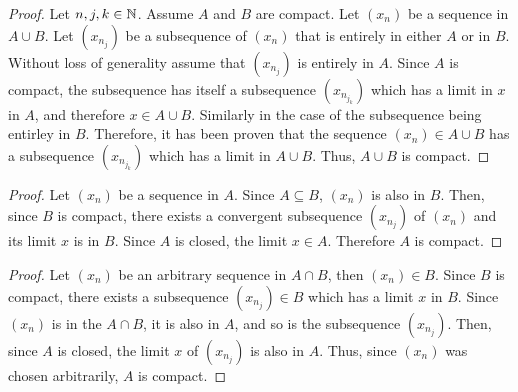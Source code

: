 \begin{questions}


\begin{solution}
  \begin{proof}
  Let $n,j,k\in\mathbb{N}$. Assume $A$ and $B$ are compact. Let $(x_n)$ be a sequence in $A\cup B$. Let $(x_{n_j})$ be a subsequence of $(x_n)$  that is entirely in either $A$ or in $B$. Without loss of generality assume that $(x_{n_j})$ is entirely in $A$. Since $A$ is compact, the subsequence has itself a subsequence $(x_{n_{j_k}})$ which has a limit in $x$ in $A$, and therefore $x\in A\cup B$. Similarly in the case of the subsequence being entirley in $B$. Therefore, it has been proven that the sequence $(x_n)\in A\cup B$ has a subsequence $(x_{n_{j_k}})$ which has a limit in $A\cup B$. Thus, $A\cup B$ is compact.
  \end{proof}
\end{solution}


\begin{solution}
  \begin{proof}
  Let $(x_n)$ be a sequence in $A$. Since $A\subseteq B$, $(x_n)$ is also in $B$. Then, since $B$ is compact, there exists a convergent subsequence $(x_{n_j})$ of $(x_n)$ and its limit $x$ is in $B$. Since $A$ is closed, the limit $x\in A$. Therefore $A$ is compact.
  \end{proof}
\end{solution}


\begin{solution}
  \begin{proof}
  Let $(x_n)$ be an arbitrary sequence in $A\cap B$, then $(x_n)\in B$. Since $B$ is compact, there exists a subsequence $(x_{n_j})\in B$ which has a limit $x$ in $B$. Since $(x_n)$ is in the $A\cap B$, it is also in $A$, and so is the subsequence $(x_{n_j})$. Then, since $A$ is closed, the limit $x$ of $(x_{n_j})$ is also in $A$. Thus, since $(x_n)$ was chosen arbitrarily, $A$ is compact.	
  \end{proof}
\end{solution}


\end{questions}